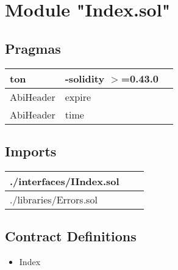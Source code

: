 
\section{Module "Index.sol"}


\subsection{Pragmas}


\noindent\begin{tabular}{|l|l|p{5cm}|}\hline
ton & -solidity $>$=0.43.0 &\\\hline
AbiHeader &  expire &\\\hline
AbiHeader &  time &\\\hline
\end{tabular}


\subsection{Imports}


\noindent\begin{tabular}{|l|l|p{5cm}|}\hline
./interfaces/IIndex.sol &\\\hline
./libraries/Errors.sol &\\\hline
\end{tabular}


\subsection{Contract Definitions}

\begin{itemize}
\item Index
\end{itemize}
